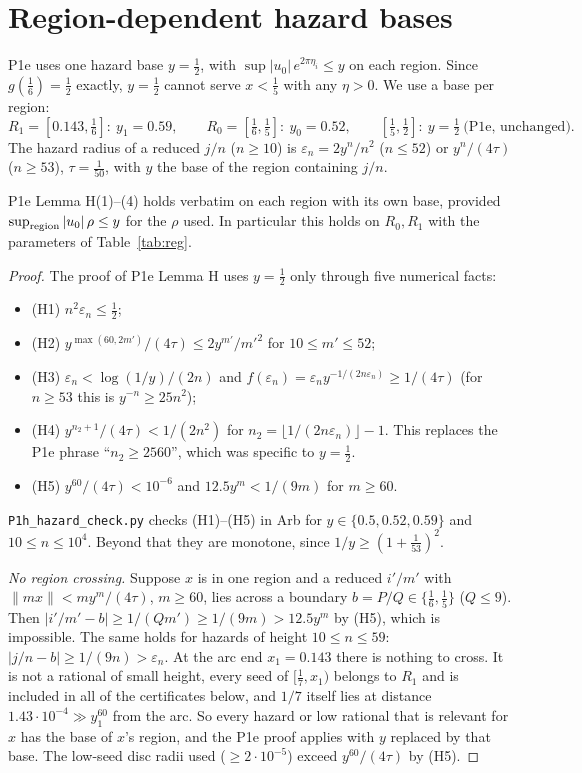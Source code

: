 \documentclass[11pt]{article}
\theoremstyle{remark}\newtheorem{remark}[theorem]{Remark}
\begin{document}
\section{Region-dependent hazard bases}\label{sec:haz}
P1e uses one hazard base $y=\frac12$, with $\sup|u_0|\,e^{2\pi\eta_i}\le y$ on each region. Since $g(\frac16)=\frac12$ exactly, $y=\frac12$ cannot serve $x<\frac15$ with any $\eta>0$. We use a base per region:
\[R_1=[0.143,\tfrac16]:\ y_1=0.59,\qquad R_0=[\tfrac16,\tfrac15]:\ y_0=0.52,\qquad [\tfrac15,\tfrac12]:\ y=\tfrac12\ \text{(P1e, unchanged)}.\]
The hazard radius of a reduced $j/n$ ($n\ge10$) is $\varepsilon_n=2y^n/n^2$ ($n\le52$) or $y^n/(4\tau)$ ($n\ge53$), $\tau=\frac1{50}$, with $y$ the base of the region containing $j/n$.

\begin{lemma}\label{lem:Hy}
P1e Lemma H(1)--(4) holds verbatim on each region with its own base, provided $\sup_{\rm region}|u_0|\,\rho\le y$ for the $\rho$ used. In particular this holds on $R_0,R_1$ with the parameters of Table~\ref{tab:reg}.
\end{lemma}
\begin{proof}
The proof of P1e Lemma H uses $y=\frac12$ only through five numerical facts:
\begin{itemize}
\item (H1) $n^2\varepsilon_n\le\frac12$;
\item (H2) $y^{\max(60,2m')}/(4\tau)\le2y^{m'}/m'^2$ for $10\le m'\le52$;
\item (H3) $\varepsilon_n<\log(1/y)/(2n)$ and $f(\varepsilon_n)=\varepsilon_ny^{-1/(2n\varepsilon_n)}\ge1/(4\tau)$ (for $n\ge53$ this is $y^{-n}\ge25n^2$);
\item (H4) $y^{n_2+1}/(4\tau)<1/(2n^2)$ for $n_2=\lfloor1/(2n\varepsilon_n)\rfloor-1$. This replaces the P1e phrase ``$n_2\ge2560$'', which was specific to $y=\frac12$.
\item (H5) $y^{60}/(4\tau)<10^{-6}$ and $12.5y^m<1/(9m)$ for $m\ge60$.
\end{itemize}
\texttt{P1h\_hazard\_check.py} checks (H1)--(H5) in Arb for $y\in\{0.5,0.52,0.59\}$ and $10\le n\le10^4$. Beyond that they are monotone, since $1/y\ge(1+\frac1{53})^2$.

\emph{No region crossing.} Suppose $x$ is in one region and a reduced $i'/m'$ with $\|mx\|<my^m/(4\tau)$, $m\ge60$, lies across a boundary $b=P/Q\in\{\frac16,\frac15\}$ ($Q\le9$). Then $|i'/m'-b|\ge1/(Qm')\ge1/(9m)>12.5y^m$ by (H5), which is impossible. The same holds for hazards of height $10\le n\le59$: $|j/n-b|\ge1/(9n)>\varepsilon_n$.
At the arc end $x_1=0.143$ there is nothing to cross. It is not a rational of small height, every seed of $[\frac17,x_1)$ belongs to $R_1$ and is included in all of the certificates below, and $1/7$ itself lies at distance $1.43\cdot10^{-4}\gg y_1^{60}$ from the arc.
So every hazard or low rational that is relevant for $x$ has the base of $x$'s region, and the P1e proof applies with $y$ replaced by that base. The low-seed disc radii used ($\ge2\cdot10^{-5}$) exceed $y^{60}/(4\tau)$ by (H5).
\end{proof}
\end{document}
